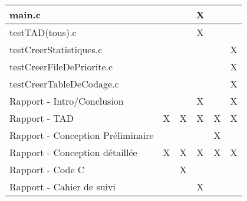 \begin{table}[h]
\begin{tabular}{l|c|c|c|c|c|}
\multicolumn{1}{|l|}{main.c}                            &                       &               & X                       &                       &                        \\ \hline
\multicolumn{1}{|l|}{testTAD(tous).c}             &                       &                & X                      &                      &                        \\ \hline
\multicolumn{1}{|l|}{testCreerStatistiques.c}          &                       &               &                       &                       & X                       \\ \hline
\multicolumn{1}{|l|}{testCreerFileDePriorite.c}       &                       &                &                       &                      & X                       \\ \hline
\multicolumn{1}{|l|}{testCreerTableDeCodage.c}           &                       &                &                       &                       & X                      \\ \hline
\multicolumn{1}{|l|}{Rapport - Intro/Conclusion}        &                       &                & X                      &                       & X                      \\ \hline
\multicolumn{1}{|l|}{Rapport - TAD}                     & X                     & X              & X                     & X                     & X                      \\ \hline
\multicolumn{1}{|l|}{Rapport - Conception Préliminaire} &                       &               &                      & X                     &                        \\ \hline
\multicolumn{1}{|l|}{Rapport - Conception détaillée}    & X                     & X              & X                     & X                     & X                      \\ \hline
\multicolumn{1}{|l|}{Rapport - Code C}                  &                      & X               &                       &                       &                        \\ \hline
\multicolumn{1}{|l|}{Rapport - Cahier de suivi}         &                       &               & X                      &                       &                        \\ \hline
\end{tabular}
\end{table}